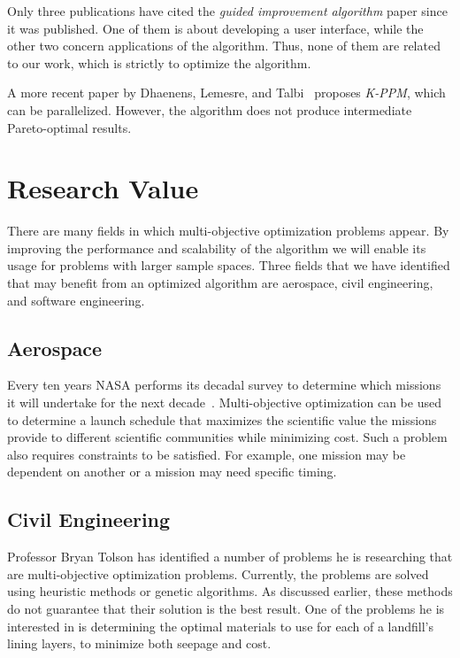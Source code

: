 \documentclass[11pt]{article}
\begin{document}
Only three publications have cited the \textit{guided improvement
algorithm} paper since it was published. One of them is about
developing a user interface, while the other two concern applications
of the algorithm. Thus, none of them are related to our work, which is
strictly to optimize the algorithm.

A more recent paper by Dhaenens, Lemesre, and Talbi~\cite{ref:kppm}
proposes \textit{\mbox{K-PPM}}, which can be parallelized. However, the
algorithm does not produce intermediate Pareto-optimal results.

\section{Research Value}
There are many fields in which multi-objective optimization problems
appear. By improving the performance and scalability of the algorithm
we will enable its usage for problems with larger sample spaces. Three
fields that we have identified that may benefit from an optimized
algorithm are aerospace, civil engineering, and software engineering.

\subsection{Aerospace}
Every ten years NASA performs its decadal survey to determine which
missions it will undertake for the next decade~\cite{ref:nasa11}.
Multi-objective optimization can be used to determine a launch schedule
that maximizes the scientific value the missions provide to different
scientific communities while minimizing cost. Such a problem also
requires constraints to be satisfied. For example, one mission may be
dependent on another or a mission may need specific timing.

\subsection{Civil Engineering}
Professor Bryan Tolson has identified a number of problems he is
researching that are multi-objective optimization problems. Currently,
the problems are solved using heuristic methods or genetic algorithms.
As discussed earlier, these methods do not guarantee that their
solution is the best result. One of the problems he is interested in is
determining the optimal materials to use for each of a landfill's
lining layers, to minimize both seepage and cost.
\end{document}
